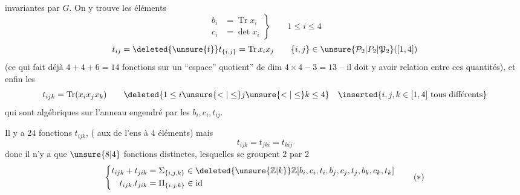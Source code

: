invariantes par $G$. On y trouve les éléments
\[
 \left.\begin{aligned}
 b_i&=\operatorname{Tr}x_i\\
 c_i&=\det x_i
 \end{aligned}\right\}\qquad1\leq i\leq4
\]
\[
 t_{ij}=\deleted{\unsure{t}}t_{\{i,j\}}=\operatorname{Tr}x_ix_j\qquad\{i,j\}\in\unsure{\mathcal P_2|P_2|\mathfrak P_2}([1,4])
\]
(ce qui fait déjà $4+4+6=14$ fonctions sur un ``espace'' quotient'' de dim $4\times4-3=13$ -- il doit y avoir   relation entre ces quantités), et enfin les
\[
 t_{ijk}=\operatorname{Tr}(x_ix_jx_k)\qquad
 \deleted{1\leq i\unsure{<|\leq}j\unsure{<|\leq}k\leq4}\quad
 \inserted{i,j,k\in[1,4]\ \text{tous différents}}
\]
qui sont algébriques sur l'anneau engendré par les $b_i,c_i,t_{ij}$.

Il y a $24$ fonctions $t_{ijk}$,  ( aux  de l'ens à $4$ éléments) mais
\[
 t_{ijk}=t_{jki}=t_{kij}
\]
donc il n'y a que $\unsure{8|4}$ fonctions distinctes, lesquelles se groupent $2$ par $2$ 
\[
 \left\{\begin{aligned}
 t_{ijk}+t_{jik}&=\Sigma_{\{i,j,k\}}\in\deleted{\unsure{\mathbb Z|k}}\mathbb Z[b_i,c_i,t_i,b_j,c_j,t_j,b_k,c_k,t_k]\\
 t_{ijk}.t_{jik}&=\Pi_{\{i,j,k\}}\in\text{id}
 \end{aligned}\right.\tag*{$(*)$}
\]
